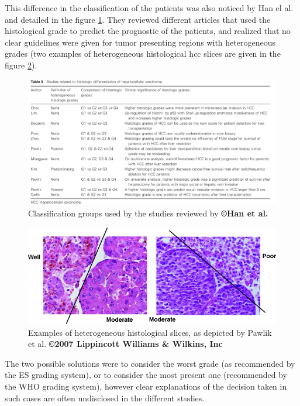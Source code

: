 This difference in the classification of the patients was also noticed
by Han el al. \cite{Han2013} and detailed in the figure \ref{fig:han2013_table3}. They reviewed different articles that used the histological grade to
predict the prognostic of the patients, and realized that no clear
guidelines were given for tumor presenting regions with heterogeneous
grades (two examples of heterogeneous histological \ac{hcc} slices are given in the figure \ref{fig:pawlik_fig4}).

\begin{figure}[th!]
\centering
\includegraphics[width=0.95\linewidth]{images/image9}
\caption{Classification groups used by the studies reviewed by \textbf{©Han et al.} \cite{Han2013}}
\label{fig:han2013_table3}
\end{figure}


\begin{figure}[th!]
\centering
\includegraphics[width=0.7\linewidth]{images/pawlik_fig4}
\caption{Examples of heterogeneous histological slices, as depicted by Pawlik et al. \cite{Pawlik2007} \textbf{©2007 Lippincott Williams \& Wilkins, Inc}}
\label{fig:pawlik_fig4}
\end{figure}


The two possible solutions were to consider the worst grade (as
recommended by the ES grading system), or to consider the most present
one (recommended by the WHO grading system), however clear explanations
of the decision taken in such cases are often undisclosed in the
different studies.

